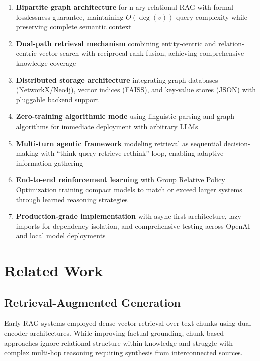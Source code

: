 \documentclass[11pt,a4paper]{article}
\begin{document}
\begin{enumerate}
    \item \textbf{Bipartite graph architecture} for n-ary relational RAG with formal losslessness guarantee, maintaining $O(\deg(v))$ query complexity while preserving complete semantic context

    \item \textbf{Dual-path retrieval mechanism} combining entity-centric and relation-centric vector search with reciprocal rank fusion, achieving comprehensive knowledge coverage

    \item \textbf{Distributed storage architecture} integrating graph databases (NetworkX/Neo4j), vector indices (FAISS), and key-value stores (JSON) with pluggable backend support

    \item \textbf{Zero-training algorithmic mode} using linguistic parsing and graph algorithms for immediate deployment with arbitrary LLMs

    \item \textbf{Multi-turn agentic framework} modeling retrieval as sequential decision-making with ``think-query-retrieve-rethink'' loop, enabling adaptive information gathering

    \item \textbf{End-to-end reinforcement learning} with Group Relative Policy Optimization training compact models to match or exceed larger systems through learned reasoning strategies

    \item \textbf{Production-grade implementation} with async-first architecture, lazy imports for dependency isolation, and comprehensive testing across OpenAI and local model deployments
\end{enumerate}

\section{Related Work}

\subsection{Retrieval-Augmented Generation}

Early RAG systems employed dense vector retrieval over text chunks using dual-encoder architectures. While improving factual grounding, chunk-based approaches ignore relational structure within knowledge and struggle with complex multi-hop reasoning requiring synthesis from interconnected sources.
\end{document}
